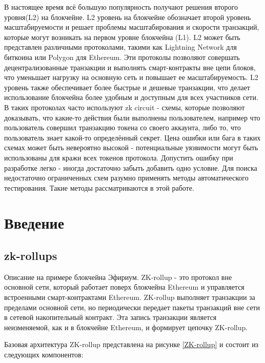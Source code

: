 \documentclass[a4paper]{article}
\begin{document}
В настоящее время всё большую популярность получают решения второго уровня(L2) на блокчейне. L2 уровень на блокчейне обозначает второй уровень масштабируемости и решает проблемы масштабирования и скорости транзакций, которые могут возникать на первом уровне блокчейна (L1).
L2 может быть представлен различными протоколами, такими как Lightning Network для биткоина или Polygon для Ethereum. Эти протоколы позволяют совершать децентрализованные транзакции и выполнять смарт-контракты вне цепи блоков, что уменьшает нагрузку на основную сеть и повышает ее масштабируемость. L2 уровень также обеспечивает более быстрые и дешевые транзакции, что делает использование блокчейна более удобным и доступным для всех участников сети. В таких протоколах часто используют zk circuit - схемы, которые позволяют доказывать, что какие-то действия были выполнены пользователем, например что пользователь совершил транзакцию токена со своего аккаунта, либо то, что пользователь знает какой-то определённый секрет. Цена ошибки или бага в таких схемах может быть невероятно высокой - потенциальные уязвимости могут быть использованы для кражи всех токенов протокола. Допустить ошибку при разработке легко - иногда достаточно забыть добавить одно условие. Для поиска недостаточно ограниченных схем разумно применять методы автоматического тестирования. Такие методы рассматриваются в этой работе.

\newpage
    \tableofcontents
\newpage
 
\newpage
\section{Введение}

\subsection{zk-rollups}
\indent

Описание на примере блокчейна Эфириум. ZK-rollup - это протокол вне основной сети, который работает поверх блокчейна Ethereum и управляется встроенными смарт-контрактами Ethereum. ZK-rollup выполняет транзакции за пределами основной сети, но периодически передает пакеты транзакций вне сети в сетевой накопительный контракт. Эта запись транзакции является неизменяемой, как и в блокчейне Ethereum, и формирует цепочку ZK-rollup.

Базовая архитектура ZK-rollup представлена на рисунке \ref{ZK-rollup} и состоит из следующих компонентов:
\end{document}
